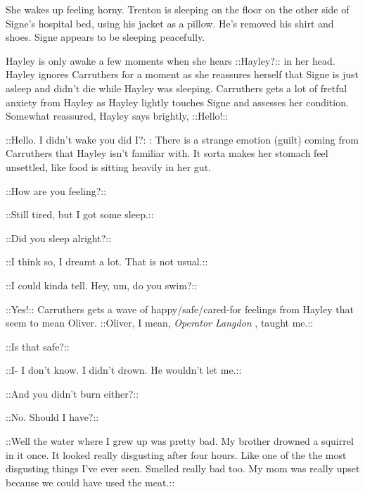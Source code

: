She wakes up feeling horny.  Trenton is sleeping on the floor on the other side of Signe's hospital bed, using his jacket as a pillow.  He's removed his shirt and shoes.  Signe appears to be sleeping peacefully.  



Hayley is only awake a few moments when she hears  {\color[RGB]{153,0,255}::Hayley?::}  in her head.  Hayley ignores Carruthers for a moment as she reassures herself that Signe is just asleep and didn't die while Hayley was sleeping.  Carruthers gets a lot of fretful anxiety from Hayley as Hayley lightly touches Signe and assesses her condition.  Somewhat reassured, Hayley says brightly,  {\color[RGB]{255,153,0}::Hello!::} 

 {\color[RGB]{153,0,255}::Hello.  I didn't wake you did I?:} :  There is a strange emotion (guilt) coming from Carruthers that Hayley isn't familiar with.  It sorta makes her stomach feel unsettled, like food is sitting heavily in her gut.

 {\color[RGB]{153,0,255}::How are you feeling?::} 

 {\color[RGB]{255,153,0}::Still tired, but I got some sleep.::} 

 {\color[RGB]{153,0,255}::Did you sleep alright?::} 

 {\color[RGB]{255,153,0}::I think so, I dreamt a lot.  That is not usual.::} 

 {\color[RGB]{153,0,255}::I could kinda tell.  Hey, um, do you swim?::} 

 {\color[RGB]{255,153,0}::Yes!:: }  Carruthers gets a wave of happy/safe/cared-for feelings from Hayley that seem to mean Oliver.   {\color[RGB]{255,153,0}::Oliver, I mean, } \textit{ {\color[RGB]{255,153,0}Operator Langdon} } {\color[RGB]{255,153,0}, taught me.::} 

 {\color[RGB]{153,0,255}::Is that safe?::} 

 {\color[RGB]{255,153,0}::I-  I don't know.  I didn't drown.  He wouldn't let me.::} 

 {\color[RGB]{153,0,255}::And you didn't burn either?::} 

 {\color[RGB]{255,153,0}::No.  Should I have?::} 

 {\color[RGB]{153,0,255}::Well the water where I grew up was pretty bad.  My brother drowned a squirrel in it once.  It looked really disgusting after four hours.  Like one of the the most disgusting things I've ever seen.  Smelled really bad too.  My mom was really upset because we could have used the meat.::} 


